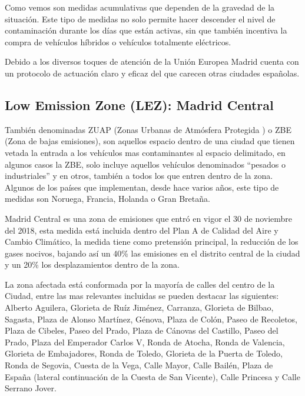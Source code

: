 
Como vemos son medidas acumulativas que dependen de la gravedad de la situación. Este tipo de medidas no solo permite hacer descender el nivel de contaminación durante los días que están activas, sin que también incentiva la compra de vehículos híbridos o vehículos totalmente eléctricos. 

Debido a los diversos toques de atención de la Unión Europea Madrid cuenta con un protocolo de actuación claro y eficaz del que carecen otras ciudades españolas.

 \subsection{Low Emission Zone (LEZ): Madrid  Central}
También denominadas ZUAP (Zonas Urbanas de Atmósfera Protegida \cite{wayback_2012}) o ZBE (Zona de bajas emisiones), son aquellos espacio dentro de una ciudad que tienen vetada la entrada a los vehículos mas contaminantes al espacio delimitado, en algunos casos la ZBE, solo incluye aquellos vehículos denominados “pesados o industriales” y en otros, también a todos los que entren dentro de la zona. Algunos de los países que implementan, desde hace varios años, este tipo de medidas son Noruega, Francia, Holanda o Gran Bretaña. 

Madrid Central es una zona de emisiones que  entró en vigor el 30 de noviembre del 2018, esta medida está incluida dentro del Plan A de Calidad del Aire y Cambio Climático, la medida tiene como pretensión principal, la reducción de los gases nocivos, bajando así un 40\% las emisiones en el distrito central de la ciudad y un 20\% los desplazamientos dentro de la zona.

La zona afectada está conformada por la mayoría de calles del centro de la Ciudad, entre las mas relevantes incluidas se pueden destacar las siguientes: Alberto Aguilera, Glorieta de Ruíz Jiménez, Carranza, Glorieta de Bilbao, Sagasta, Plaza de Alonso Martínez, Génova, Plaza de Colón, Paseo de Recoletos, Plaza de Cibeles, Paseo del Prado, Plaza de Cánovas del Castillo, Paseo del Prado, Plaza del Emperador Carlos V, Ronda de Atocha, Ronda de Valencia, Glorieta de Embajadores, Ronda de Toledo, Glorieta de la Puerta de Toledo, Ronda de Segovia, Cuesta de la Vega, Calle Mayor, Calle Bailén, Plaza de España (lateral continuación de la Cuesta de San Vicente), Calle Princesa y Calle Serrano Jover.


